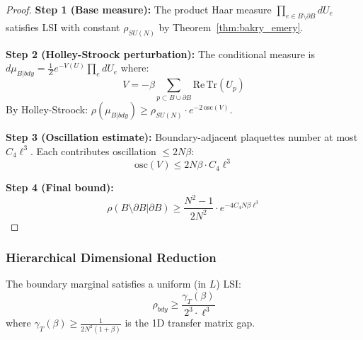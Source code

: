 \begin{proof}
\textbf{Step 1 (Base measure):}
The product Haar measure $\prod_{e \in B \setminus \partial B} dU_e$ satisfies LSI with constant $\rho_{SU(N)}$ by Theorem~\ref{thm:bakry_emery}.

\textbf{Step 2 (Holley-Stroock perturbation):}
The conditional measure is $d\mu_{B|bdy} = \frac{1}{Z} e^{-V(U)} \prod_e dU_e$ where:
\begin{equation}
V = -\beta \sum_{p \subset B \cup \partial B} \mathrm{Re}\,\mathrm{Tr}(U_p)
\end{equation}
By Holley-Stroock: $\rho(\mu_{B|bdy}) \geq \rho_{SU(N)} \cdot e^{-2\,\mathrm{osc}(V)}$.

\textbf{Step 3 (Oscillation estimate):}
Boundary-adjacent plaquettes number at most $C_4 \ell^3$. Each contributes oscillation $\leq 2N\beta$:
\begin{equation}
\mathrm{osc}(V) \leq 2N\beta \cdot C_4 \ell^3
\end{equation}

\textbf{Step 4 (Final bound):}
\begin{equation}
\rho(B \setminus \partial B | \partial B) \geq \frac{N^2-1}{2N^2} \cdot e^{-4C_4 N\beta \ell^3}
\end{equation}
\end{proof}

\subsubsection{Hierarchical Dimensional Reduction}

\begin{theorem}
\label{thm:boundary_lsi}
The boundary marginal satisfies a uniform (in $L$) LSI:
\begin{equation}
\rho_{bdy} \geq \frac{\gamma_T(\beta)}{2^3 \cdot \ell^3}
\end{equation}
where $\gamma_T(\beta) \geq \frac{1}{2N^2(1+\beta)}$ is the 1D transfer matrix gap.
\end{theorem}

